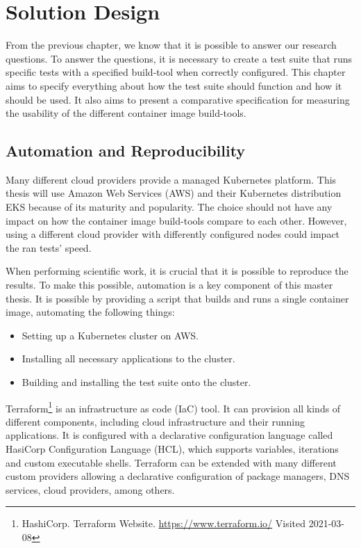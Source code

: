 \chapter{Solution Design}
From the previous chapter, we know that it is possible to answer our research questions. To answer the questions, it is necessary to create a test suite that runs specific tests with a specified build-tool when correctly configured. This chapter aims to specify everything about how the test suite should function and how it should be used. It also aims to present a comparative specification for measuring the usability of the different container image build-tools.

\section{Automation and Reproducibility}
Many different cloud providers provide a managed Kubernetes platform. This thesis will use Amazon Web Services (AWS) and their Kubernetes distribution EKS because of its maturity and popularity. The choice should not have any impact on how the container image build-tools compare to each other. However, using a different cloud provider with differently configured nodes could impact the ran tests' speed.

When performing scientific work, it is crucial that it is possible to reproduce the results. To make this possible, automation is a key component of this master thesis. It is possible by providing a script that builds and runs a single container image, automating the following things:
\begin{itemize}
    \item Setting up a Kubernetes cluster on AWS.
    \item Installing all necessary applications to the cluster. 
    \item Building and installing the test suite onto the cluster.
\end{itemize}

Terraform\footnote{HashiCorp. Terraform Website. \url{https://www.terraform.io/} Visited 2021-03-08} is an infrastructure as code (IaC) tool. It can provision all kinds of different components, including cloud infrastructure and their running applications. It is configured with a declarative configuration language called HasiCorp Configuration Language (HCL), which supports variables, iterations and custom executable shells. Terraform can be extended with many different custom providers allowing a declarative configuration of package managers, DNS services, cloud providers, among others. 

